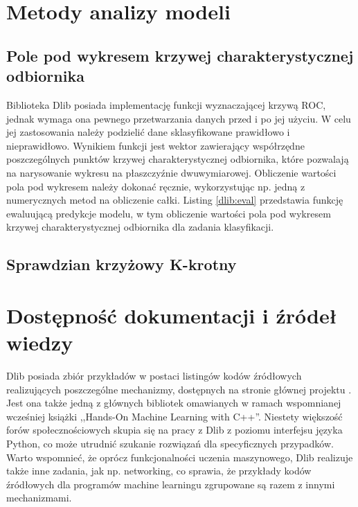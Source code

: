 \section{Metody analizy modeli}

\subsection{Pole pod wykresem krzywej charakterystycznej odbiornika}

Biblioteka Dlib posiada implementację funkcji wyznaczającej krzywą ROC, jednak wymaga ona pewnego przetwarzania danych przed i po jej użyciu. W celu jej zastosowania należy podzielić dane sklasyfikowane prawidłowo i nieprawidłowo. Wynikiem funkcji jest wektor zawierający współrzędne poszczególnych punktów krzywej charakterystycznej odbiornika, które pozwalają na narysowanie wykresu na płaszczyźnie dwuwymiarowej. Obliczenie wartości pola pod wykresem należy dokonać ręcznie, wykorzystując np. jedną z numerycznych metod na obliczenie całki. Listing \ref{dlib:eval} przedstawia funkcję ewaluującą predykcje modelu, w tym obliczenie wartości pola pod wykresem krzywej charakterystycznej odbiornika dla zadania klasyfikacji.


\subsection{Sprawdzian krzyżowy K-krotny}

\section{Dostępność dokumentacji i źródeł wiedzy}

Dlib posiada zbiór przykładów w postaci listingów kodów źródłowych realizujących poszczególne mechanizmy, dostępnych na stronie głównej projektu \cite{dlib:home}. Jest ona także jedną z głównych bibliotek omawianych w ramach wspomnianej wcześniej książki ,,Hands-On Machine Learning with C++''. Niestety większość forów społecznościowych skupia się na pracy z Dlib z poziomu interfejsu języka Python, co może utrudnić szukanie rozwiązań dla specyficznych przypadków. Warto wspomnieć, że oprócz funkcjonalności uczenia maszynowego, Dlib realizuje także inne zadania, jak np. networking, co sprawia, że przykłady kodów źródłowych dla programów machine learningu zgrupowane są razem z innymi mechanizmami. 